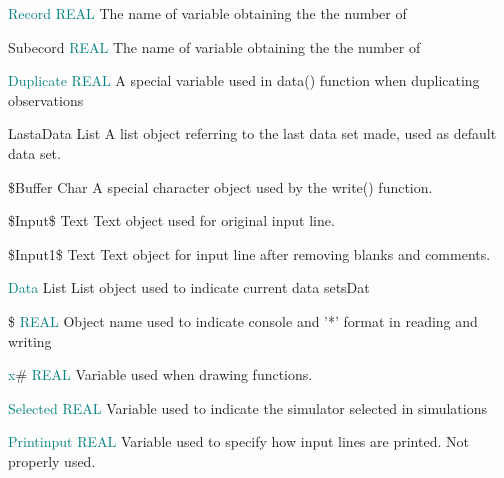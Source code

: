 { 
\noindent \textcolor{teal}{Record} \tabto{25mm }   \textcolor{teal}{REAL}  \tabto{45mm }   The name of variable obtaining the the number of 
 
 
\noindent Subecord \tabto{25mm }   \textcolor{teal}{REAL}  \tabto{45mm }   The name of variable obtaining the the number of 
 
 
\noindent \textcolor{teal}{Duplicate} \tabto{25mm }   \textcolor{teal}{REAL} \tabto{45mm }   A special variable used in \textcolor{VioletRed}{data}() function when duplicating observations 
 
 
\noindent LastaData  \tabto{25mm }  List \tabto{45mm }  	A list object referring to the last data set made, used as default data set. 
 
 
\noindent \$Buffer \tabto{25mm }  Char \tabto{45mm }   A special character object used by the \textcolor{VioletRed}{write}() function. 
 
 
\noindent \$Input\$ \tabto{25mm }   Text  \tabto{45mm }   Text object used for original input line. 
 
\$Input1\$  \tabto{25mm }  Text \tabto{45mm }   Text object for input line after removing blanks and comments. 
 
 
\noindent \textcolor{teal}{Data}  \tabto{25mm }  List \tabto{45mm }    List object used to indicate current data setsDat 
 
 
 
 
 
 
 
 
 
 
 
 
 
 
 
 
 
 
 
 
 
 
 
 
 
 
\noindent \$ \tabto{25mm }  \textcolor{teal}{REAL} \tabto{45mm }   Object name used to indicate console and '*' format in reading and writing 
 
 
\noindent \textcolor{teal}{x}\# \tabto{25mm }  \textcolor{teal}{REAL} \tabto{45mm }   Variable used when drawing functions. 
 
\noindent \textcolor{teal}{Selected} \tabto{25mm }   \textcolor{teal}{REAL}  \tabto{45mm }  Variable used to indicate the simulator selected in simulations 
 
\noindent \textcolor{teal}{Printinput} \tabto{25mm }   \textcolor{teal}{REAL} \tabto{45mm }   Variable used to specify how input lines are printed. Not properly used. 
 
}
